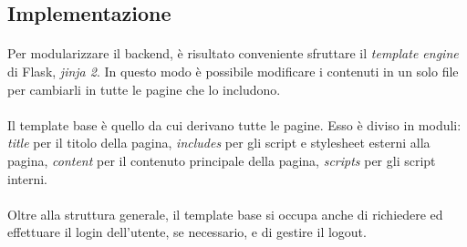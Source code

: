 \documentclass[11pt,a4paper,english]{article}
\begin{document}
\subsection{Implementazione}

\paragraph{} Per modularizzare il backend, è risultato conveniente sfruttare il \emph{template engine} di Flask, \emph{jinja 2}. In questo modo è possibile modificare i contenuti in un solo file per cambiarli in tutte le pagine che lo includono.

\paragraph{} Il template base è quello da cui derivano tutte le pagine. Esso è diviso in moduli: \emph{title} per il titolo della pagina, \emph{includes} per gli script e stylesheet esterni alla pagina, \emph{content} per il contenuto principale della pagina, \emph{scripts} per gli script interni. 

\paragraph{} Oltre alla struttura generale, il template base si occupa anche di richiedere ed effettuare il login dell'utente, se necessario, e di gestire il logout. 
\end{document}
